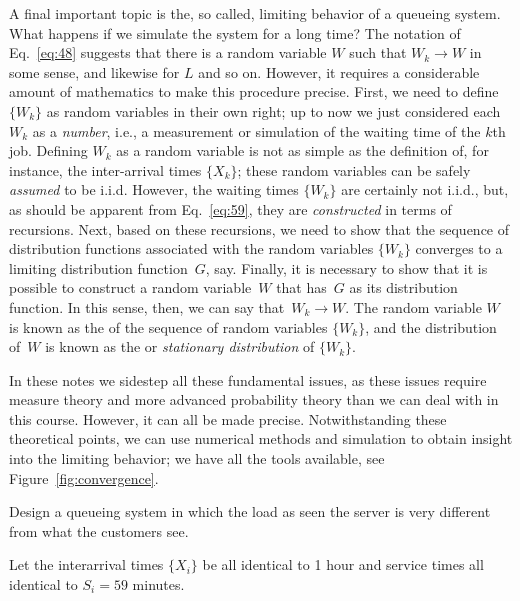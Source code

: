 A final important topic is the, so called, limiting behavior of a
queueing system. What happens if we simulate the system for a long
time? The notation of Eq.~\eqref{eq:48} suggests that there is a
random variable $W$ such that $W_k\to W$ in some sense, and likewise
for $L$ and so on. However, it requires a considerable amount of
mathematics to make this procedure precise. First, we need to define
$\{W_k\}$ as random variables in their own right; up to now we just
considered each $W_k$ as a \emph{number}, i.e., a measurement or
simulation of the waiting time of the $k$th job. Defining $W_k$ as a
random variable is not as simple as the definition of, for instance,
the inter-arrival times $\{X_k\}$; these random variables can be
safely \emph{assumed} to be i.i.d. However, the waiting times
$\{W_k\}$ are certainly not i.i.d., but, as should be apparent from
Eq.~\eqref{eq:59}, they are \emph{constructed} in terms of
recursions. Next, based on these recursions, we need to show that the
sequence of distribution functions associated with the random
variables $\{W_k\}$ converges to a limiting distribution function~$G$,
say. Finally, it is necessary to show that it is possible to construct
a random variable~$W$ that has~$G$ as its distribution function.  In
this sense, then, we can say that~$W_k \to W$. The random variable $W$
is known as the  of the sequence of random
variables $\{W_k\}$, and the distribution of~$W$ is known as the
 or \emph{stationary distribution} of $\{W_k\}$.


In these notes we sidestep all these fundamental issues, as these
issues require measure theory and more advanced probability theory
than we can deal with in this course. However, it can all be made
precise.  Notwithstanding these theoretical points, we can use
numerical methods and simulation to obtain insight into the limiting
behavior; we have all the tools available, see Figure~\ref{fig:convergence}. 

\begin{question}
\label{ex:1}
Design a queueing system in which the load as seen the server is very
different from what the customers see.
  \begin{solution}
    Let the interarrival times $\{X_i\}$ be all identical to 1 hour
    and service times all identical to $S_i=59$ minutes.
  \end{solution}
\end{question}


